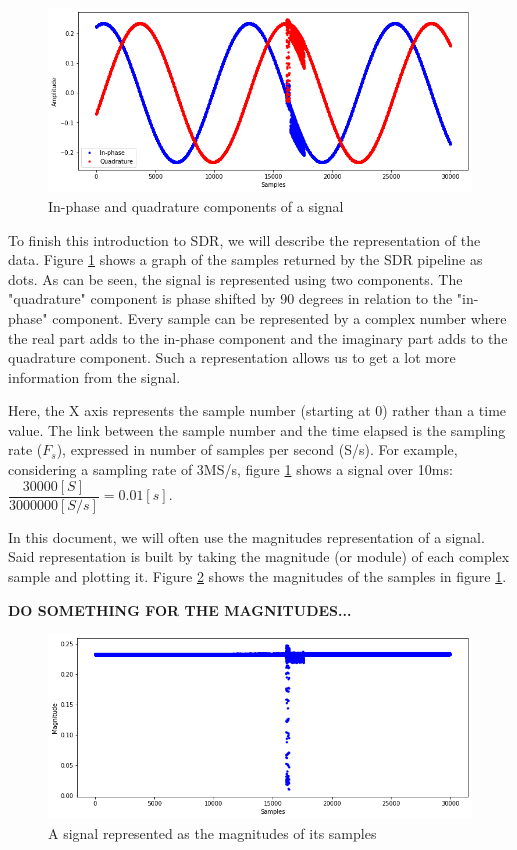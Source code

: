 \begin{figure}[htp!]
  \centering
  \includegraphics[scale=0.5]{figures/concepts_IQ-signal.png}
  \caption{In-phase and quadrature components of a signal}
  \label{fig:iq-signal}
\end{figure}

To finish this introduction to SDR, we will describe the representation of the data. Figure \ref{fig:iq-signal} shows a graph of the samples returned by the SDR pipeline as dots. As can be seen, the signal is represented using two components. The "quadrature" component is phase shifted by 90 degrees in relation to the "in-phase" component. Every sample can be represented by a complex number where the real part adds to the in-phase component and the imaginary part adds to the quadrature component. Such a representation allows us to get a lot more information from the signal. \cite{kuisma_iq, ossmann_software}

Here, the X axis represents the sample number (starting at 0) rather than a time value. The link between the sample number and the time elapsed is the sampling rate ($F_s$), expressed in number of samples per second (S/s). For example, considering a sampling rate of 3MS/s, figure \ref{fig:iq-signal} shows a signal over 10ms: $\dfrac{30000[S]}{3000000[S/s]} = 0.01[s]$.

In this document, we will often use the magnitudes representation of a signal. Said representation is built by taking the magnitude (or module) of each complex sample and plotting it. Figure \ref{fig:mag} shows the magnitudes of the samples in figure \ref{fig:iq-signal}.

\textbf{DO SOMETHING FOR THE MAGNITUDES...}

\begin{figure}[htp!]
  \centering
  \includegraphics[scale=0.5]{figures/concepts_magnitudes.png}
  \caption{A signal represented as the magnitudes of its samples}
  \label{fig:mag}
\end{figure}

